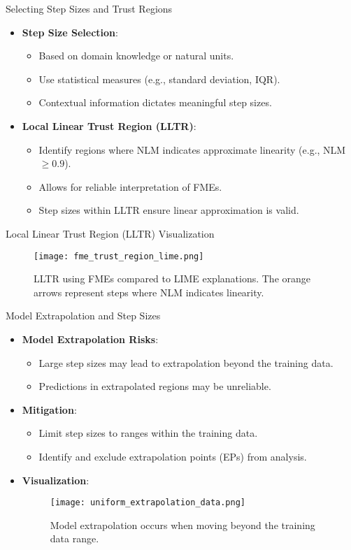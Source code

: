 \documentclass[11pt,compress,t,notes=noshow, aspectratio=169, xcolor=table]{beamer}
\begin{document}
\begin{frame}{Selecting Step Sizes and Trust Regions}
\begin{itemize}
\item \textbf{Step Size Selection}:
\begin{itemize}
  \item Based on domain knowledge or natural units.
  \item Use statistical measures (e.g., standard deviation, IQR).
  \item Contextual information dictates meaningful step sizes.
\end{itemize}
\item \textbf{Local Linear Trust Region (LLTR)}:
\begin{itemize}
  \item Identify regions where NLM indicates approximate linearity (e.g., NLM $\geq 0.9$).
  \item Allows for reliable interpretation of FMEs.
  \item Step sizes within LLTR ensure linear approximation is valid.
\end{itemize}
\end{itemize}
\end{frame}

\begin{frame}{Local Linear Trust Region (LLTR) Visualization}
\begin{figure}
  \centering
  \texttt{[image: fme\_trust\_region\_lime.png]}
  \caption{LLTR using FMEs compared to LIME explanations. The orange arrows represent steps where NLM indicates linearity.}
\end{figure}
\end{frame}

\begin{frame}{Model Extrapolation and Step Sizes}
\begin{itemize}
\item \textbf{Model Extrapolation Risks}:
\begin{itemize}
\item Large step sizes may lead to extrapolation beyond the training data.
\item Predictions in extrapolated regions may be unreliable.
\end{itemize}
\item \textbf{Mitigation}:
\begin{itemize}
\item Limit step sizes to ranges within the training data.
\item Identify and exclude extrapolation points (EPs) from analysis.
\end{itemize}
\item \textbf{Visualization}:
\begin{figure}
  \centering
  \texttt{[image: uniform\_extrapolation\_data.png]}
  \caption{Model extrapolation occurs when moving beyond the training data range.}
\end{figure}
\end{itemize}
\end{frame}
\end{document}
